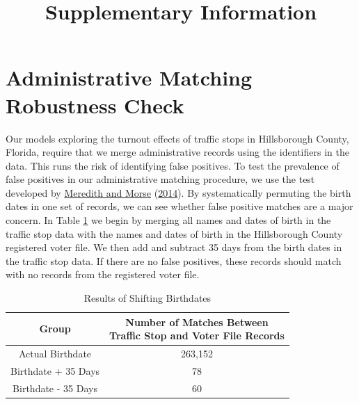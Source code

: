 \documentclass[
  12pt,
]{article}
\title{Supplementary Information}
\author{}
\date{\vspace{-2.5em}}
\begin{document}
\maketitle

{
\setcounter{tocdepth}{2}
\tableofcontents
}
\doublespacing

\hypertarget{administrative-matching-robustness-check}{%
\section*{Administrative Matching Robustness Check}\label{administrative-matching-robustness-check}}

Our models exploring the turnout effects of traffic stops in Hillsborough County, Florida, require that we merge administrative records using the identifiers in the data. This runs the risk of identifying false positives. To test the prevalence of false positives in our administrative matching procedure, we use the test developed by \protect\hyperlink{ref-Meredith2014}{Meredith and Morse} (\protect\hyperlink{ref-Meredith2014}{2014}). By systematically permuting the birth dates in one set of records, we can see whether false positive matches are a major concern. In Table \ref{tab:change-dobs} we begin by merging all names and dates of birth in the traffic stop data with the names and dates of birth in the Hillsborough County registered voter file. We then add and subtract 35 days from the birth dates in the traffic stop data. If there are no false positives, these records should match with no records from the registered voter file.

\begin{singlespace}
\begin{table}[H]

\caption{\label{tab:shift-dobs-chunk}\label{tab:change-dobs} Results of Shifting Birthdates}
\centering
\begin{tabular}[t]{cc}
\toprule
Group & \makecell[c]{Number of Matches Between\\Traffic Stop and Voter File Records}\\
\midrule
Actual Birthdate & 263,152\\
Birthdate + 35 Days & 78\\
Birthdate - 35 Days & 60\\
\bottomrule
\end{tabular}
\end{table}
\end{singlespace}
\end{document}
